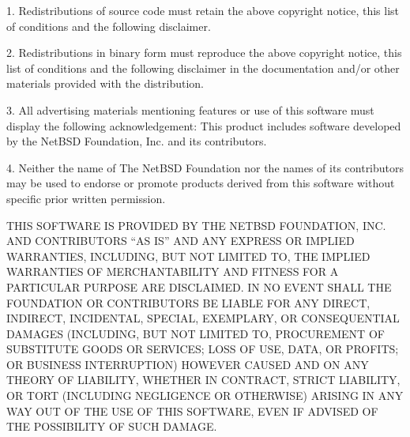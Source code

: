 \documentclass[twoside]{tceusermanual}
\begin{document}
   1. Redistributions of source code must retain the above copyright
      notice, this list of conditions and the following disclaimer.

   2. Redistributions in binary form must reproduce the above copyright
      notice, this list of conditions and the following disclaimer in the
      documentation and/or other materials provided with the distribution.

   3. All advertising materials mentioning features or use of this software
      must display the following acknowledgement:
        This product includes software developed by the NetBSD
        Foundation, Inc. and its contributors.

   4. Neither the name of The NetBSD Foundation nor the names of its
      contributors may be used to endorse or promote products derived
      from this software without specific prior written permission.
  
   THIS SOFTWARE IS PROVIDED BY THE NETBSD FOUNDATION, INC. AND CONTRIBUTORS
   ``AS IS'' AND ANY EXPRESS OR IMPLIED WARRANTIES, INCLUDING, BUT NOT LIMITED
   TO, THE IMPLIED WARRANTIES OF MERCHANTABILITY AND FITNESS FOR A PARTICULAR
   PURPOSE ARE DISCLAIMED.  IN NO EVENT SHALL THE FOUNDATION OR CONTRIBUTORS
   BE LIABLE FOR ANY DIRECT, INDIRECT, INCIDENTAL, SPECIAL, EXEMPLARY, OR
   CONSEQUENTIAL DAMAGES (INCLUDING, BUT NOT LIMITED TO, PROCUREMENT OF
   SUBSTITUTE GOODS OR SERVICES; LOSS OF USE, DATA, OR PROFITS; OR BUSINESS
   INTERRUPTION) HOWEVER CAUSED AND ON ANY THEORY OF LIABILITY, WHETHER IN
   CONTRACT, STRICT LIABILITY, OR TORT (INCLUDING NEGLIGENCE OR OTHERWISE)
   ARISING IN ANY WAY OUT OF THE USE OF THIS SOFTWARE, EVEN IF ADVISED OF THE
   POSSIBILITY OF SUCH DAMAGE.


\cleardoublepage

\end{document}
